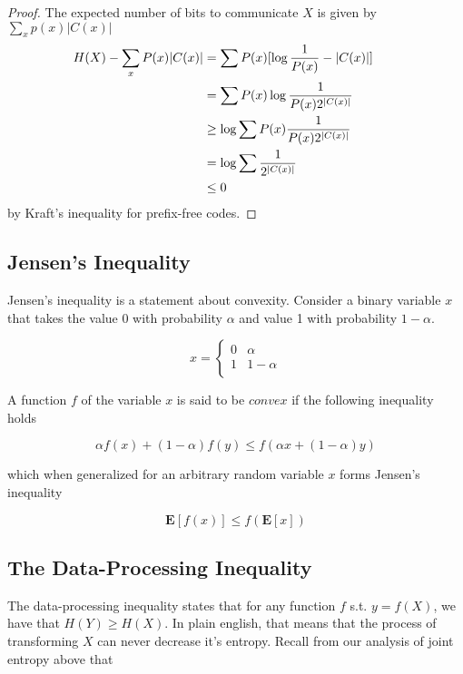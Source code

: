 \documentclass[a4paper,11pt]{book}
\begin{document}
\begin{proof}
  The expected number of bits to communicate $X$ is given by $\sum_{x}p(x)|C(x)|$
  \begin{align*}
    H(X) - \sum_{x}P(x)|C(x)| &= \sum P(x)[\log\frac{1}{P(x)} - |C(x)|] \\
    &= \sum P(x)\log\frac{1}{P(x)2^{|C(x)|}} \\
    &\geq \log\sum P(x)\frac{1}{P(x)2^{|C(x)|}}  \\
    &= \log\sum \frac{1}{2^{|C(x)|}}  \\
    &\leq 0 &&\qedhere
  \end{align*}
  by Kraft's inequality for prefix-free codes.
\end{proof}


\subsection{Jensen's Inequality}

Jensen's inequality is a statement about convexity. Consider a binary variable $x$ that takes the value 0 with probability $\alpha$ and value 1 with probability $1-\alpha$.

\[x= \begin{cases} 
      0 & \alpha \\
      1 & 1-\alpha \\
   \end{cases}
\]

A function $f$ of the variable $x$ is said to be $\textit{convex}$ if the following inequality holds

\begin{equation*}
\alpha f(x) + (1-\alpha)f(y) \leq f(\alpha x + (1-\alpha)y)
\end{equation*}

which when generalized for an arbitrary random variable $x$ forms Jensen's inequality

\begin{equation}
\mathbf{E}[f(x)] \leq f(\mathbf{E}[x])
\end{equation}

\subsection{The Data-Processing Inequality}

The data-processing inequality states that for any function $f$ s.t. $y = f(X)$, we have that $H(Y) \geq H(X)$. In plain english, that means that the process of transforming $X$ can never decrease it's entropy. Recall from our analysis of joint entropy above that
\end{document}
